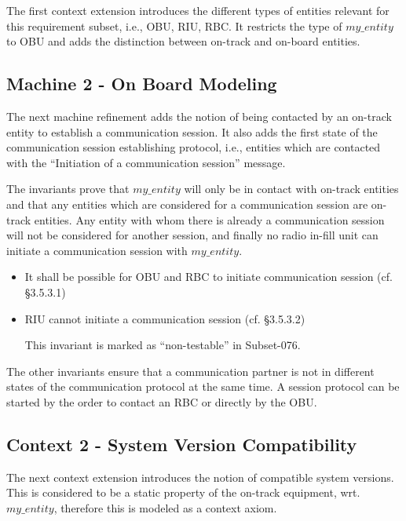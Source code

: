 \documentclass[10pt,a4paper]{article}
\begin{document}
The first context extension introduces the different types of entities relevant
for this requirement subset, i.e., OBU, RIU, RBC. It restricts the type of
$my\_entity$ to OBU and adds the distinction between on-track and on-board
entities.



\subsection{Machine 2 - On Board Modeling}
\label{sec:machine-2-board}

The next machine refinement adds the notion of being contacted by an on-track
entity to establish a communication session. It also adds the first state of the
communication session establishing protocol, i.e., entities which are contacted
with the ``Initiation of a communication session'' message.

The invariants prove that $my\_entity$ will only be in contact with on-track
entities and that any entities which are considered for a communication session
are on-track entities. Any entity with whom there is already a communication
session will not be considered for another session, and finally no radio in-fill
unit can initiate a communication session with $my\_entity$.

\begin{itemize}
\item It shall be possible for OBU and RBC to initiate communication session
  (cf. §3.5.3.1)
\item RIU cannot initiate a communication session (cf. §3.5.3.2)

This invariant is marked as ``non-testable'' in Subset-076.
\end{itemize}

The other invariants ensure that a communication partner is not in different
states of the communication protocol at the same time. A session protocol can be
started by the order to contact an RBC or directly by the OBU.



\subsection{Context 2 - System Version Compatibility}
\label{sec:context-2-system}

The next context extension introduces the notion of compatible system
versions. This is considered to be a static property of the on-track equipment,
wrt. $my\_entity$, therefore this is modeled as a context axiom.
\end{document}

